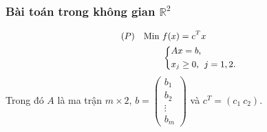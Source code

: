 \documentclass[12pt,a4paper]{report}
\begin{document}
\subsubsection*{Bài toán trong không gian $\mathbb{R}^2$}

\begin{equation} \small \label{chinhtac}
	\begin{split}
	(P) \quad \text{Min } & f(x) = c^Tx \\
		& \left\{
		\begin{split}
		& Ax=b, \\
		& x_j \geq 0, \:\: j=1,2.
		\end{split}
		\right.    
	\end{split}
\end{equation}
Trong đó $A$ là ma trận $m\times 2$, $b=\begin{pmatrix}
	b_1 \\
	b_2 \\
	\vdots \\
	b_m
	\end{pmatrix}$ và $c^T=(c_1 \: c_2 )$.
\end{document}
